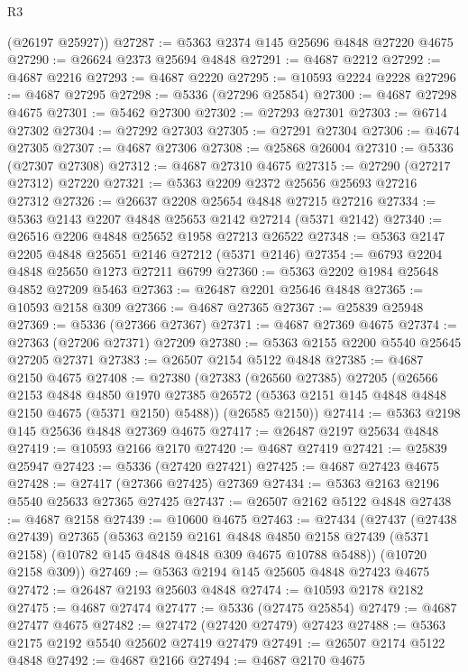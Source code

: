 \begin{lexlean}{R3}
\begin{coremodule}
      (@26197 @25927))
@27287 := @5363 @2374 @145 @25696 @4848 @27220 @4675
@27290 := @26624 @2373 @25694 @4848
@27291 := @4687 @2212
@27292 := @4687 @2216
@27293 := @4687 @2220
@27295 := @10593 @2224 @2228
@27296 := @4687 @27295
@27298 := @5336 (@27296 @25854)
@27300 := @4687 @27298 @4675
@27301 := @5462 @27300
@27302 := @27293 @27301
@27303 := @6714 @27302
@27304 := @27292 @27303
@27305 := @27291 @27304
@27306 := @4674 @27305
@27307 := @4687 @27306
@27308 := @25868 @26004
@27310 := @5336 (@27307 @27308)
@27312 := @4687 @27310 @4675
@27315 := @27290 (@27217 @27312) @27220
@27321 := @5363 @2209 @2372 @25656 @25693 @27216 @27312
@27326 := @26637 @2208 @25654 @4848 @27215 @27216
@27334 := @5363 @2143 @2207 @4848 @25653 @2142 @27214 (@5371 @2142)
@27340 := @26516 @2206 @4848 @25652 @1958 @27213 @26522
@27348 := @5363 @2147 @2205 @4848 @25651 @2146 @27212 (@5371 @2146)
@27354 := @6793 @2204 @4848 @25650 @1273 @27211 @6799
@27360 := @5363 @2202 @1984 @25648 @4852 @27209 @5463
@27363 := @26487 @2201 @25646 @4848
@27365 := @10593 @2158 @309
@27366 := @4687 @27365
@27367 := @25839 @25948
@27369 := @5336 (@27366 @27367)
@27371 := @4687 @27369 @4675
@27374 := @27363 (@27206 @27371) @27209
@27380 := @5363 @2155 @2200 @5540 @25645 @27205 @27371
@27383 := @26507 @2154 @5122 @4848
@27385 := @4687 @2150 @4675
@27408 := @27380
    (@27383
      (@26560 @27385)
      @27205
      (@26566
        @2153
        @4848
        @4850
        @1970
        @27385
        @26572
        (@5363 @2151 @145 @4848 @4848 @2150 @4675 (@5371 @2150) @5488))
      (@26585 @2150))
@27414 := @5363 @2198 @145 @25636 @4848 @27369 @4675
@27417 := @26487 @2197 @25634 @4848
@27419 := @10593 @2166 @2170
@27420 := @4687 @27419
@27421 := @25839 @25947
@27423 := @5336 (@27420 @27421)
@27425 := @4687 @27423 @4675
@27428 := @27417 (@27366 @27425) @27369
@27434 := @5363 @2163 @2196 @5540 @25633 @27365 @27425
@27437 := @26507 @2162 @5122 @4848
@27438 := @4687 @2158
@27439 := @10600 @4675
@27463 := @27434
    (@27437
      (@27438 @27439)
      @27365
      (@5363
        @2159
        @2161
        @4848
        @4850
        @2158
        @27439
        (@5371 @2158)
        (@10782 @145 @4848 @4848 @309 @4675 @10788 @5488))
      (@10720 @2158 @309))
@27469 := @5363 @2194 @145 @25605 @4848 @27423 @4675
@27472 := @26487 @2193 @25603 @4848
@27474 := @10593 @2178 @2182
@27475 := @4687 @27474
@27477 := @5336 (@27475 @25854)
@27479 := @4687 @27477 @4675
@27482 := @27472 (@27420 @27479) @27423
@27488 := @5363 @2175 @2192 @5540 @25602 @27419 @27479
@27491 := @26507 @2174 @5122 @4848
@27492 := @4687 @2166
@27494 := @4687 @2170 @4675

\end{coremodule}
\end{lexlean}
